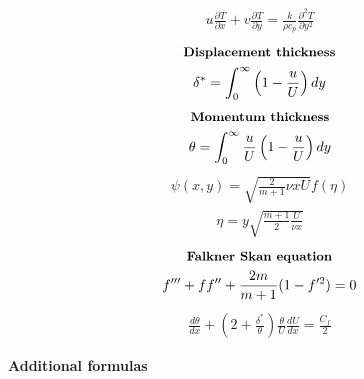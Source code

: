 \documentclass[10pt, a4paper]{article}
\newcommand{\derivative}[2]{\frac{\partial #1}{\partial #2}}
\begin{document}
\begin{multicols*}{2}
\begin{gather*}
        u\derivative{ T}{x} + v \derivative{ T}{y} =
        \frac{k}{\rho c_p} \derivative{^2 T}{y^2}
    \end{gather*}
    \begin{gather*}
        \textbf{\small Displacement thickness} \\
        \delta^* = \int_0^\infty\left( 1 - \frac{u}{U} \right)dy
    \end{gather*}
    \begin{gather*}
        \textbf{\small Momentum thickness} \\
        \theta = \int_0^\infty \frac{u}{U}\left( 1 - \frac{u}{U} \right)dy
    \end{gather*}
    \begin{gather*}
        \psi(x,y) = \sqrt{\frac{2}{m+1}\nu x U}f(\eta)
    \end{gather*}
    \begin{gather*}
        \eta = y \sqrt{\frac{m+1}{2}\frac{U}{\nu x}}
    \end{gather*}
    \begin{gather*}
        \textbf{\small Falkner Skan equation} \\
        f''' + ff'' + \frac{2m}{m+1}(1-f'^2)=0
    \end{gather*}
    \begin{gather*}
        \frac{d\theta}{dx} + \left( 2 + \frac{\delta^*}{\theta} \right)\frac{\theta}{U}\frac{dU}{dx} =
        \frac{C_f}{2}
    \end{gather*}
\end{multicols*}
\begin{center}
    \Large
    \textbf{Additional formulas}
    \vspace{0.5cm}
\end{center}
\end{document}
